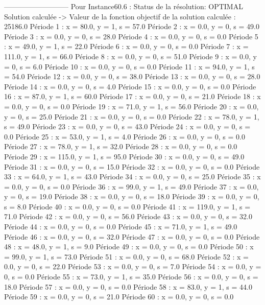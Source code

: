 ---------------------------
Pour Instance60.6  :
Status de la résolution: OPTIMAL
Solution calculée
-> Valeur de la fonction objectif de la solution calculée :  25186.0
Période 1 : x = 80.0, y = 1, s = 57.0
Période 2 : x = 0.0, y = 0, s = 49.0
Période 3 : x = 0.0, y = 0, s = 28.0
Période 4 : x = 0.0, y = 0, s = 0.0
Période 5 : x = 49.0, y = 1, s = 22.0
Période 6 : x = 0.0, y = 0, s = 0.0
Période 7 : x = 111.0, y = 1, s = 66.0
Période 8 : x = 0.0, y = 0, s = 51.0
Période 9 : x = 0.0, y = 0, s = 6.0
Période 10 : x = 0.0, y = 0, s = 0.0
Période 11 : x = 94.0, y = 1, s = 54.0
Période 12 : x = 0.0, y = 0, s = 38.0
Période 13 : x = 0.0, y = 0, s = 28.0
Période 14 : x = 0.0, y = 0, s = 4.0
Période 15 : x = 0.0, y = 0, s = 0.0
Période 16 : x = 87.0, y = 1, s = 60.0
Période 17 : x = 0.0, y = 0, s = 21.0
Période 18 : x = 0.0, y = 0, s = 0.0
Période 19 : x = 71.0, y = 1, s = 56.0
Période 20 : x = 0.0, y = 0, s = 25.0
Période 21 : x = 0.0, y = 0, s = 0.0
Période 22 : x = 78.0, y = 1, s = 49.0
Période 23 : x = 0.0, y = 0, s = 43.0
Période 24 : x = 0.0, y = 0, s = 0.0
Période 25 : x = 53.0, y = 1, s = 4.0
Période 26 : x = 0.0, y = 0, s = 0.0
Période 27 : x = 78.0, y = 1, s = 32.0
Période 28 : x = 0.0, y = 0, s = 0.0
Période 29 : x = 115.0, y = 1, s = 95.0
Période 30 : x = 0.0, y = 0, s = 49.0
Période 31 : x = 0.0, y = 0, s = 15.0
Période 32 : x = 0.0, y = 0, s = 0.0
Période 33 : x = 64.0, y = 1, s = 43.0
Période 34 : x = 0.0, y = 0, s = 25.0
Période 35 : x = 0.0, y = 0, s = 0.0
Période 36 : x = 99.0, y = 1, s = 49.0
Période 37 : x = 0.0, y = 0, s = 19.0
Période 38 : x = 0.0, y = 0, s = 18.0
Période 39 : x = 0.0, y = 0, s = 8.0
Période 40 : x = 0.0, y = 0, s = 0.0
Période 41 : x = 119.0, y = 1, s = 71.0
Période 42 : x = 0.0, y = 0, s = 56.0
Période 43 : x = 0.0, y = 0, s = 32.0
Période 44 : x = 0.0, y = 0, s = 0.0
Période 45 : x = 71.0, y = 1, s = 49.0
Période 46 : x = 0.0, y = 0, s = 32.0
Période 47 : x = 0.0, y = 0, s = 0.0
Période 48 : x = 48.0, y = 1, s = 9.0
Période 49 : x = 0.0, y = 0, s = 0.0
Période 50 : x = 99.0, y = 1, s = 73.0
Période 51 : x = 0.0, y = 0, s = 68.0
Période 52 : x = 0.0, y = 0, s = 22.0
Période 53 : x = 0.0, y = 0, s = 7.0
Période 54 : x = 0.0, y = 0, s = 0.0
Période 55 : x = 73.0, y = 1, s = 35.0
Période 56 : x = 0.0, y = 0, s = 18.0
Période 57 : x = 0.0, y = 0, s = 0.0
Période 58 : x = 83.0, y = 1, s = 44.0
Période 59 : x = 0.0, y = 0, s = 21.0
Période 60 : x = 0.0, y = 0, s = 0.0



